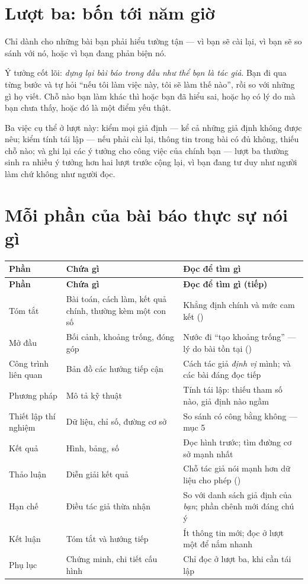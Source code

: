 \documentclass[../../english.tex]{subfiles}
\begin{document}
\section{Lượt ba: bốn tới năm giờ}

Chỉ dành cho những bài bạn phải hiểu tường tận --- vì bạn sẽ cài lại, vì bạn sẽ so sánh với nó, hoặc vì bạn đang phản biện nó.

Ý tưởng cốt lõi: \emph{dựng lại bài báo trong đầu như thể bạn là tác giả}. Bạn đi qua từng bước và tự hỏi ``nếu tôi làm việc này, tôi sẽ làm thế nào'', rồi so với những gì họ viết. Chỗ nào bạn làm khác thì hoặc bạn đã hiểu sai, hoặc họ có lý do mà bạn chưa thấy, hoặc đó là một điểm yếu thật.

Ba việc cụ thể ở lượt này: kiểm mọi giả định --- kể cả những giả định không được nêu; kiểm tính tái lập --- nếu phải cài lại, thông tin trong bài có đủ không, thiếu chỗ nào; và ghi lại các ý tưởng cho công việc của chính bạn --- lượt ba thường sinh ra nhiều ý tưởng hơn hai lượt trước cộng lại, vì bạn đang tư duy như người làm chứ không như người đọc.

\section{Mỗi phần của bài báo thực sự nói gì}

\begin{center}\footnotesize
{}
\begin{longtable}{@{}L{2.9cm}L{5.2cm}L{6.1cm}@{}}
\toprule
\textbf{Phần} & \textbf{Chứa gì} & \textbf{Đọc để tìm gì}\\
\midrule
\endfirsthead
\toprule
\textbf{Phần} & \textbf{Chứa gì} & \textbf{Đọc để tìm gì (tiếp)}\\
\midrule
\endhead
Tóm tắt & Bài toán, cách làm, kết quả chính, thường kèm một con số & Khẳng định chính và mức cam kết ()\\
Mở đầu & Bối cảnh, khoảng trống, đóng góp & Nước đi ``tạo khoảng trống'' --- lý do bài tồn tại ()\\
Công trình liên quan & Bản đồ các hướng tiếp cận & Cách tác giả \emph{định vị} mình; và các bài đáng đọc tiếp\\
Phương pháp & Mô tả kỹ thuật & Tính tái lập: thiếu tham số nào, giả định nào ngầm\\
Thiết lập thí nghiệm & Dữ liệu, chỉ số, đường cơ sở & So sánh có công bằng không --- mục 5\\
Kết quả & Hình, bảng, số & Đọc hình trước; tìm đường cơ sở mạnh nhất\\
Thảo luận & Diễn giải kết quả & Chỗ tác giả nói mạnh hơn dữ liệu cho phép ()\\
Hạn chế & Điều tác giả thừa nhận & So với danh sách giả định của \emph{bạn}; phần chênh mới đáng chú ý\\
Kết luận & Tóm tắt và hướng tiếp & Ít thông tin mới; đọc ở lượt một để nắm nhanh\\
Phụ lục & Chứng minh, chi tiết cấu hình & Chỉ đọc ở lượt ba, khi cần tái lập\\
\bottomrule
\end{longtable}
\end{center}
\end{document}
